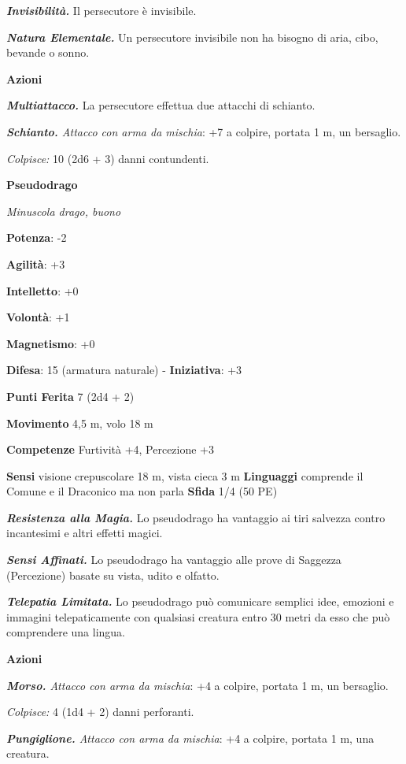 \begin{multicols}{2}
\emph{\textbf{Invisibilità.}} Il persecutore è invisibile.

\emph{\textbf{Natura Elementale.}} Un persecutore invisibile non ha
bisogno di aria, cibo, bevande o sonno.

\smallskip\textbf{Azioni}

\emph{\textbf{Multiattacco.}} La persecutore effettua due attacchi di
schianto.

\emph{\textbf{Schianto.} Attacco con arma da mischia}: +7 a colpire,
portata 1 m, un bersaglio.

\emph{Colpisce:} 10 (2d6 + 3) danni contundenti.

\textbf{Pseudodrago}

\emph{Minuscola drago, buono}

\textbf{Potenza}: -2

\textbf{Agilità}: +3

\textbf{Intelletto}: +0

\textbf{Volontà}: +1

\textbf{Magnetismo}: +0

\textbf{Difesa}: 15 (armatura naturale) - \textbf{Iniziativa}: +3

\textbf{Punti Ferita} 7 (2d4 + 2)

\textbf{Movimento} 4,5 m, volo 18 m

\textbf{Competenze} Furtività +4, Percezione +3

\textbf{Sensi} visione crepuscolare 18 m, vista cieca 3 m
\textbf{Linguaggi} comprende il Comune e il Draconico ma non parla
\textbf{Sfida} 1/4 (50 PE)\smallskip

\emph{\textbf{Resistenza alla Magia.}} Lo pseudodrago ha vantaggio ai
tiri salvezza contro incantesimi e altri effetti magici.

\emph{\textbf{Sensi Affinati.}} Lo pseudodrago ha vantaggio alle prove
di Saggezza (Percezione) basate su vista, udito e olfatto.

\emph{\textbf{Telepatia Limitata.}} Lo pseudodrago può comunicare
semplici idee, emozioni e immagini telepaticamente con qualsiasi
creatura entro 30 metri da esso che può comprendere una lingua.

\smallskip\textbf{Azioni}

\emph{\textbf{Morso.} Attacco con arma da mischia}: +4 a colpire,
portata 1 m, un bersaglio.

\emph{Colpisce:} 4 (1d4 + 2) danni perforanti.

\emph{\textbf{Pungiglione.} Attacco con arma da mischia}: +4 a colpire,
portata 1 m, una creatura.


\end{multicols}
